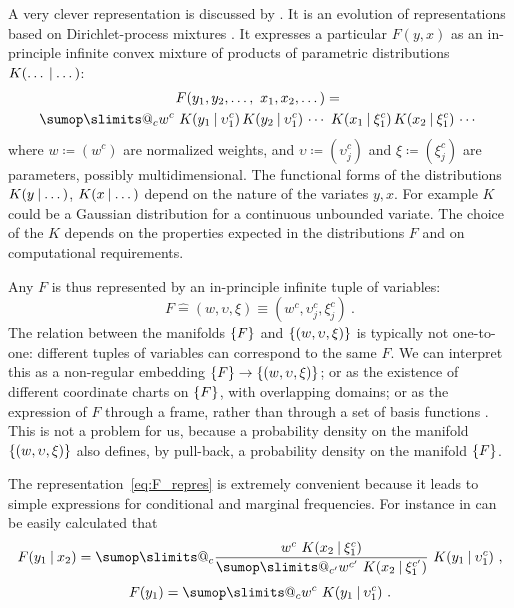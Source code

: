 \documentclass[a4paper,12pt,%
onecolumn,oneside,article,%
british%
]{memoir}
\makeatletter
\def\sum{\DOTSI\sumop\slimits@}
\newcommand*{\defd}{\coloneqq}
\newcommand*{\corr}{\mathrel{\hat{=}}}%
\DeclarePairedDelimiter\set{\{}{\}} %
\renewcommand*{\|}[1][]{\nonscript\:#1\vert\nonscript\:\mathopen{}}
\newcommand*{\chap}{ch.}%
\newcommand*{\eg}{{e.g.}}
\makeatother
\begin{document}
A very clever representation is discussed by \cites{dunsonetal2011}\autocites[see also][]{bhattacharyaetal2012,rossi2014}. It is an evolution of representations based on Dirichlet-process mixtures \autocites[\eg][]{antoniak1974,ferguson1983,escobaretal1995,muelleretal1996,rasmussen1999}. It expresses a particular $F(y,x)$ as an in-principle infinite convex mixture of products of parametric distributions $K(\dotso \| \dotso)$:
\begin{multline}
  \label{eq:F_repres}
  F(y_{1},y_{2}, \dotsc,\ x_{1}, x_{2}, \dotsc) ={}\\
  \sum_{c} w^{c}\
  K(y_{1} \| \upsilon^{c}_{1})\,  K(y_{2} \| \upsilon^{c}_{1})\, \dotsm\ 
  K(x_{1} \| \xi^{c}_{1})\,  K(x_{2} \| \xi^{c}_{1})\, \dotsm\ 
\end{multline}
where $w\defd (w^{c})$ are normalized weights, and $\upsilon \defd (\upsilon^{c}_{j})$ and $\xi \defd (\xi^{c}_{j})$ are parameters, possibly multidimensional. The functional forms of the distributions $K(y \| \dotso)$, $K(x \| \dotso)$ depend on the nature of the variates $y,x$. For example $K$ could be a Gaussian distribution for a continuous unbounded variate. The choice of the $K$ depends on the properties expected in the distributions $F$ and on computational requirements.

Any $F$ is thus represented by an in-principle infinite tuple of variables:
\begin{equation}
  \label{eq:F_coords}
  F \corr (w, \upsilon, \xi) \equiv (w^{c}, \upsilon^{c}_{j}, \xi^{c}_{j}) \ .
\end{equation}
The relation between the manifolds $\set{F}$ and $\set{(w, \upsilon, \xi)}$ is typically not one-to-one: different tuples of variables can correspond to the same $F$. We can interpret this as a non-regular embedding $\set{F} \to \set{(w, \upsilon, \xi)}$; or as the existence of different coordinate charts on $\set{F}$, with overlapping domains; or as the expression of $F$ through a frame\autocites{balanetal2006}[\chap~8]{heil1998_r2011}[\chap~3]{daubechies1992_r1999}, rather than through a set of basis functions . This is not a problem for us, because a probability density on the manifold $\set{(w, \upsilon, \xi)}$ also defines, by pull-back, a probability density on the manifold $\set{F}$.

The representation~\eqref{eq:F_repres} is extremely convenient because it leads to simple expressions for conditional and marginal frequencies. For instance in can be easily calculated that
\begin{gather}
  \label{eq:Fconditional_example}
  F(y_{1} \| x_{2}) =
  \sum_{c}
  \frac{ w^{c}\ K(x_{2} \| \xi^{c}_{1})}{
   \sum_{c'} w^{c'}\ K(x_{2} \| \xi^{c'}_{1})
}\ 
  K(y_{1} \| \upsilon^{c}_{1}) \ ,
\\[\jot]
  F(y_{1}) =
  \sum_{c} w^{c}\ K(y_{1} \| \upsilon^{c}_{1}) \ .
\end{gather}
\end{document}
